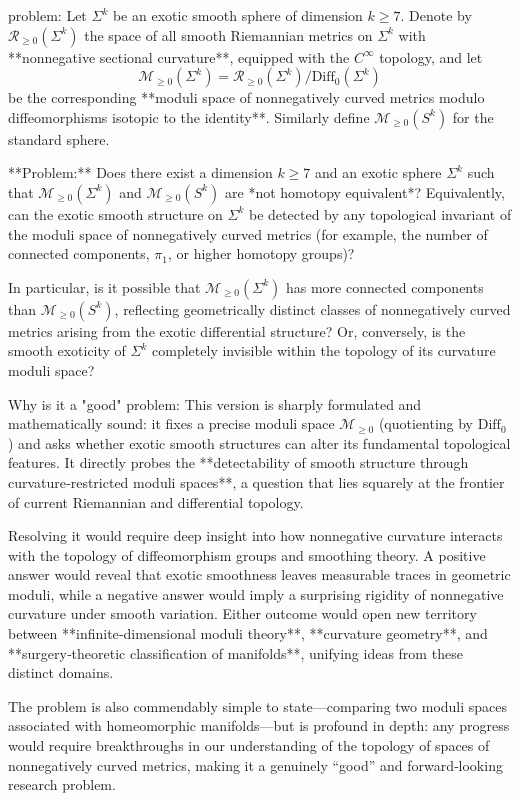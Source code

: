 problem:  
Let $\Sigma^k$ be an exotic smooth sphere of dimension $k \ge 7$.  
Denote by $\mathcal{R}_{\ge0}(\Sigma^k)$ the space of all smooth Riemannian metrics on $\Sigma^k$ with **nonnegative sectional curvature**, equipped with the $C^\infty$ topology, and let  
\[
\mathcal{M}_{\ge0}(\Sigma^k) = \mathcal{R}_{\ge0}(\Sigma^k) / \mathrm{Diff}_0(\Sigma^k)
\]
be the corresponding **moduli space of nonnegatively curved metrics modulo diffeomorphisms isotopic to the identity**.  
Similarly define $\mathcal{M}_{\ge0}(S^k)$ for the standard sphere.

**Problem:**  
Does there exist a dimension $k \ge 7$ and an exotic sphere $\Sigma^k$ such that $\mathcal{M}_{\ge0}(\Sigma^k)$ and $\mathcal{M}_{\ge0}(S^k)$ are *not homotopy equivalent*?  
Equivalently, can the exotic smooth structure on $\Sigma^k$ be detected by any topological invariant of the moduli space of nonnegatively curved metrics (for example, the number of connected components, $\pi_1$, or higher homotopy groups)?  

In particular, is it possible that $\mathcal{M}_{\ge0}(\Sigma^k)$ has more connected components than $\mathcal{M}_{\ge0}(S^k)$, reflecting geometrically distinct classes of nonnegatively curved metrics arising from the exotic differential structure?  
Or, conversely, is the smooth exoticity of $\Sigma^k$ completely invisible within the topology of its curvature moduli space?  

Why is it a "good" problem:  
This version is sharply formulated and mathematically sound: it fixes a precise moduli space $\mathcal{M}_{\ge0}$ (quotienting by $\mathrm{Diff}_0$) and asks whether exotic smooth structures can alter its fundamental topological features. It directly probes the **detectability of smooth structure through curvature‑restricted moduli spaces**, a question that lies squarely at the frontier of current Riemannian and differential topology.  

Resolving it would require deep insight into how nonnegative curvature interacts with the topology of diffeomorphism groups and smoothing theory. A positive answer would reveal that exotic smoothness leaves measurable traces in geometric moduli, while a negative answer would imply a surprising rigidity of nonnegative curvature under smooth variation. Either outcome would open new territory between **infinite‑dimensional moduli theory**, **curvature geometry**, and **surgery‑theoretic classification of manifolds**, unifying ideas from these distinct domains.  

The problem is also commendably simple to state—comparing two moduli spaces associated with homeomorphic manifolds—but is profound in depth: any progress would require breakthroughs in our understanding of the topology of spaces of nonnegatively curved metrics, making it a genuinely “good” and forward‑looking research problem.